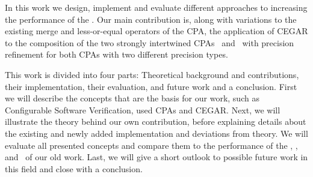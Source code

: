 In this work we design, implement and evaluate different approaches to increasing the performance of the \symbolicExecutionCPA.
Our main contribution is, along with variations to the existing merge and less-or-equal operators of the CPA,
the application of CEGAR \cite{Clarke2003} to the composition of the two strongly intertwined CPAs \symbolicValueAnalysisCPA\ and \constraintsCPA\ with precision refinement for both CPAs
with two different precision types.

This work is divided into four parts: Theoretical background and contributions, their implementation, their evaluation, and future work and a conclusion.
First we will describe the concepts that are the basis for our work, such as Configurable Software Verification, used CPAs and CEGAR.
Next, we will illustrate the theory behind our own contribution,
before explaining details about the existing and newly added implementation and deviations from theory.
We will evaluate all presented concepts and compare them to the performance of the , \predicateCPA, and \symbolicExecutionCPA\ of our old work.
Last, we will give a short outlook to possible future work in this field and close with a conclusion.
